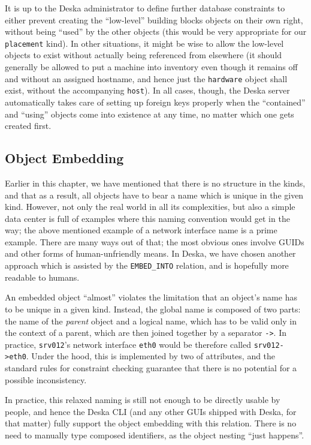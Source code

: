 \documentclass{article}
\begin{document}
It is up to the Deska administrator to define further database constraints to either prevent creating the ``low-level''
building blocks objects on their own right, without being ``used'' by the other objects (this would be very appropriate
for our {\tt placement} kind).  In other situations, it might be wise to allow the low-level objects to exist without
actually being referenced from elsewhere (it should generally be allowed to put a machine into inventory even though it
remains off and without an assigned hostname, and hence just the {\tt hardware} object shall exist, without the
accompanying {\tt host}).  In all cases, though, the Deska server automatically takes care of setting up foreign keys
properly when the ``contained'' and ``using'' objects come into existence at any time, no matter which one gets created
first.

\subsection{Object Embedding}

Earlier in this chapter, we have mentioned that there is no structure in the kinds, and that as a result, all objects
have to bear a name which is unique in the given kind.  However, not only the real world in all its complexities, but
also a simple data center is full of examples where this naming convention would get in the way; the above mentioned
example of a network interface name is a prime example.  There are many ways out of that; the most obvious ones involve
GUIDs and other forms of human-unfriendly means.  In Deska, we have chosen another approach which is assisted by the
{\tt EMBED\_INTO} relation, and is hopefully more readable to humans.

An embedded object ``almost'' violates the limitation that an object's name has to be unique in a given kind.  Instead,
the global name is composed of two parts: the name of the {\em parent} object and a logical name, which has to be valid
only in the context of a parent, which are then joined together by a separator {\tt ->}.  In practice, {\tt srv012}'s
network interface {\tt eth0} would be therefore called {\tt srv012->eth0}.  Under the hood, this is implemented by
two of attributes, and the standard rules for constraint checking guarantee that there is no potential for a possible
inconsistency.

In practice, this relaxed naming is still not enough to be directly usable by people, and hence the Deska CLI (and any
other GUIs shipped with Deska, for that matter) fully support the object embedding with this relation.  There is no need
to manually type composed identifiers, as the object nesting ``just happens''.
\end{document}
